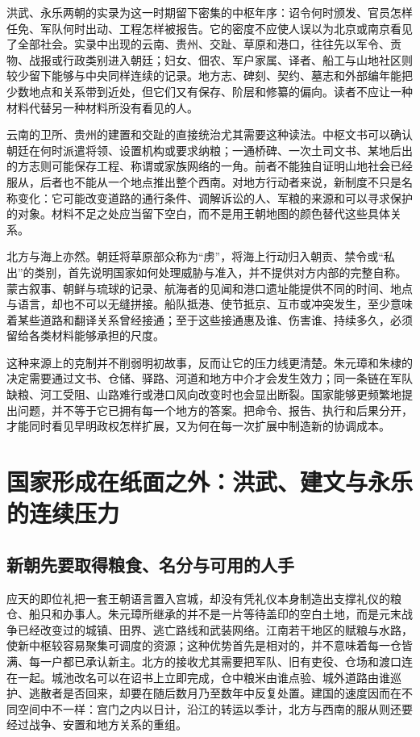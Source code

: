 洪武、永乐两朝的实录为这一时期留下密集的中枢年序：诏令何时颁发、官员怎样任免、军队何时出动、工程怎样被报告。它的密度不应使人误以为北京或南京看见了全部社会。实录中出现的云南、贵州、交趾、草原和港口，往往先以军令、贡物、战报或行政类别进入朝廷；妇女、佃农、军户家属、译者、船工与山地社区则较少留下能够与中央同样连续的记录。地方志、碑刻、契约、墓志和外部编年能把少数地点和关系带到近处，但它们又有保存、阶层和修纂的偏向。读者不应让一种材料代替另一种材料所没有看见的人。

云南的卫所、贵州的建置和交趾的直接统治尤其需要这种读法。中枢文书可以确认朝廷在何时派遣将领、设置机构或要求纳粮；一通桥碑、一次土司文书、某地后出的方志则可能保存工程、称谓或家族网络的一角。前者不能独自证明山地社会已经服从，后者也不能从一个地点推出整个西南。对地方行动者来说，新制度不只是名称变化：它可能改变道路的通行条件、调解诉讼的人、军粮的来源和可以寻求保护的对象。材料不足之处应当留下空白，而不是用王朝地图的颜色替代这些具体关系。

北方与海上亦然。朝廷将草原部众称为“虏”，将海上行动归入朝贡、禁令或“私出”的类别，首先说明国家如何处理威胁与准入，并不提供对方内部的完整自称。蒙古叙事、朝鲜与琉球的记录、航海者的见闻和港口遗址能提供不同的时间、地点与语言，却也不可以无缝拼接。船队抵港、使节抵京、互市或冲突发生，至少意味着某些道路和翻译关系曾经接通；至于这些接通惠及谁、伤害谁、持续多久，必须留给各类材料能够承担的尺度。

这种来源上的克制并不削弱明初故事，反而让它的压力线更清楚。朱元璋和朱棣的决定需要通过文书、仓储、驿路、河道和地方中介才会发生效力；同一条链在军队缺粮、河工受阻、山路难行或港口风向改变时也会显出断裂。国家能够更频繁地提出问题，并不等于它已拥有每一个地方的答案。把命令、报告、执行和后果分开，才能同时看见早明政权怎样扩展，又为何在每一次扩展中制造新的协调成本。

\section{国家形成在纸面之外：洪武、建文与永乐的连续压力}

\subsection{新朝先要取得粮食、名分与可用的人手}

应天的即位礼把一套王朝语言置入宫城，却没有凭礼仪本身制造出支撑礼仪的粮仓、船只和办事人。朱元璋所继承的并不是一片等待盖印的空白土地，而是元末战争已经改变过的城镇、田界、逃亡路线和武装网络。江南若干地区的赋粮与水路，使新中枢较容易聚集可调度的资源；这种优势首先是相对的，并不意味着每一仓皆满、每一户都已承认新主。北方的接收尤其需要把军队、旧有吏役、仓场和渡口连在一起。城池改名可以在诏书上立即完成，仓中粮米由谁点验、城外道路由谁巡护、逃散者是否回来，却要在随后数月乃至数年中反复处置。建国的速度因而在不同空间中不一样：宫门之内以日计，沿江的转运以季计，北方与西南的服从则还要经过战争、安置和地方关系的重组。

